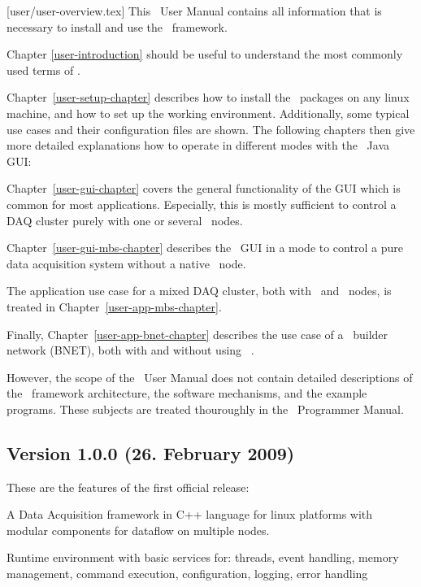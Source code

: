 [user/user-overview.tex]
This \dabc\ User Manual contains all information that is necessary to
install and use the \dabc\ framework.

Chapter \ref{user-introduction} should be useful to understand the
most commonly used terms of \dabc.

Chapter~\ref{user-setup-chapter} describes how to install the
\dabc\ packages on any linux machine, and how to set up the working
environment. Additionally, some typical use cases and their configuration
files are shown. 
The following chapters then give more detailed explanations how to operate
in different modes with the \dabc\ Java GUI:

Chapter~\ref{user-gui-chapter}
covers the general functionality of the GUI
which is common for most applications. Especially, this 
is mostly sufficient
to control a DAQ cluster purely with one or several \dabc\ nodes.

Chapter~\ref{user-gui-mbs-chapter} describes the \dabc\ GUI 
in a mode to control a pure \mbs data acquisition system without 
a native \dabc\ node.

The application use case for a mixed DAQ cluster, both with \dabc\ and \mbs\ nodes, is
treated in Chapter~\ref{user-app-mbs-chapter}.

Finally, Chapter~\ref{user-app-bnet-chapter} describes the use case of
a \dabc\ builder network (BNET), both with and without using \mbs\ .

However, the scope of the \dabc\ User Manual does not contain 
detailed descriptions of the \dabc\ framework architecture, 
the software mechanisms, and the example programs. 
These subjects are treated thouroughly
in the \dabc\ Programmer Manual.


\subsection{Version 1.0.0 (26. February 2009)}
These are the features of the first official release:
\bnum
\item A Data Acquisition framework in C++ language for linux platforms
   with modular components for dataflow on multiple nodes.
   
\item Runtime environment with basic services for:
   threads, event handling, memory management, command execution, 
   configuration, logging, error handling

